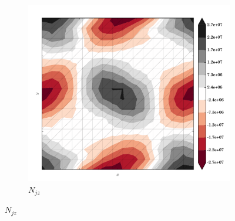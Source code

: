\begin{figure}
  \begin{subfigure}[b]{0.3\linewidth}
    \includegraphics[width=\linewidth]{images/stress_balance/FS/N_jz.pdf}
  \caption{$N_{jz}$}
  \label{fs_N_jz}
  \end{subfigure}


\end{figure}
